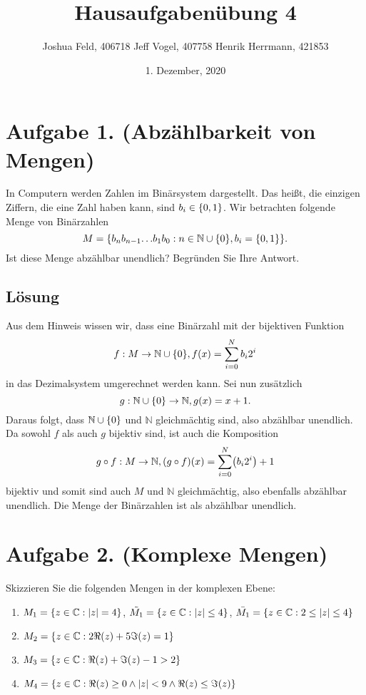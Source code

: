 \documentclass[german,12pt]{homework}
\title{Hausaufgabenübung 4}
\author{Joshua Feld, 406718 \quad Jeff Vogel, 407758 \quad Henrik Herrmann, 421853}
\date{1. Dezember, 2020}
\institute{RWTH Aachen University\\Center for Computational Engineering Science}
\newcommand{\NN}{\mathbb{N}}
\newcommand{\CC}{\mathbb{C}}
\DeclarePairedDelimiter{\absolute}{\lvert}{\rvert}
\DeclarePairedDelimiter{\enbrace}{(}{)}
\DeclarePairedDelimiter{\penbrace}{\{}{\}}
\begin{document}
    \maketitle

    \section*{Aufgabe 1. (Abzählbarkeit von Mengen)}

    \begin{problem}
        In Computern werden Zahlen im Binärsystem dargestellt. Das heißt, die einzigen Ziffern, die eine Zahl haben kann, sind \(b_i \in \penbrace*{0, 1}\). Wir betrachten folgende Menge von Binärzahlen
        \[M = \penbrace*{b_nb_{n - 1}{\ldots}b_1b_0: n \in \NN \cup \penbrace*{0}, b_i = \penbrace*{0, 1}}.\]
        Ist diese Menge abzählbar unendlich? Begründen Sie Ihre Antwort.
    \end{problem}

    \subsection*{Lösung}  Aus dem Hinweis wissen wir, dass eine Binärzahl mit der bijektiven Funktion
    \[f: M \to \NN \cup \penbrace*{0}, f\enbrace*{x} = \sum_{i = 0}^Nb_i2^i\]
    in das Dezimalsystem umgerechnet werden kann. Sei nun zusätzlich
    \[g: \NN \cup \penbrace*{0} \to \NN, g\enbrace*{x} = x + 1.\]
    Daraus folgt, dass \(\NN \cup \penbrace*{0}\) und \(\NN\) gleichmächtig sind, also abzählbar unendlich. Da sowohl \(f\) als auch \(g\) bijektiv sind, ist auch die Komposition
    \[g \circ f: M \to \NN, \enbrace*{g \circ f}\enbrace*{x} = \sum_{i = 0}^N\enbrace*{b_i2^i} + 1\]
    bijektiv und somit sind auch \(M\) und \(\NN\) gleichmächtig, also ebenfalls abzählbar unendlich. Die Menge der Binärzahlen ist als abzählbar unendlich.

    \section*{Aufgabe 2. (Komplexe Mengen)}

    \begin{problem}
        Skizzieren Sie die folgenden Mengen in der komplexen Ebene:
        \begin{enumerate}
            \item \(M_1 = \penbrace*{z \in \CC: \absolute*{z} = 4}\), \(\tilde{M_1} = \penbrace*{z \in \CC: \absolute*{z} \le 4}\), \(\bar{M_1} = \penbrace*{z \in \CC: 2 \le \absolute*{z} \le 4}\)
            \item \(M_2 = \penbrace*{z \in \CC: 2\Re\enbrace*{z} + 5\Im\enbrace*{z} = 1}\)
            \item \(M_3 = \penbrace*{z \in \CC: \Re\enbrace*{z} + \Im\enbrace*{z} - 1 > 2}\)
            \item \(M_4 = \penbrace*{z \in \CC: \Re\enbrace*{z} \ge 0 \land \absolute*{z} < 9 \land \Re\enbrace*{z} \le \Im\enbrace*{z}}\)
        \end{enumerate}
    \end{problem}
\end{document}
